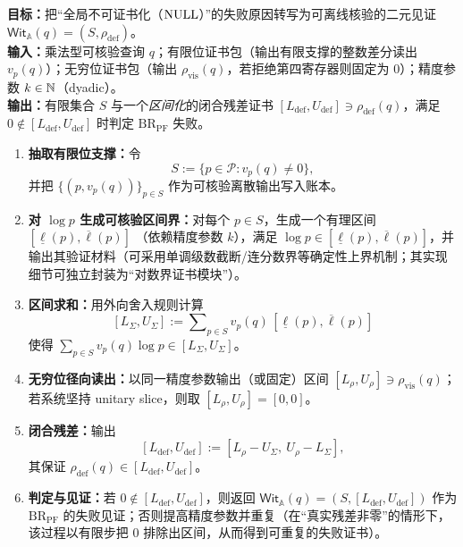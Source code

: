 \begin{algorithm}\label{alg:future-adelic-witness}
\textbf{目标：}把“全局不可证书化（$\mathrm{NULL}$）”的失败原因转写为可离线核验的二元见证 $\mathsf{Wit}_{\mathbb{A}}(q)=(S,\rho_{\mathrm{def}})$。\\
\textbf{输入：}乘法型可核验查询 $q$；有限位证书包（输出有限支撑的整数差分读出 $v_p(q)$）；无穷位证书包（输出 $\rho_{\mathrm{vis}}(q)$，若拒绝第四寄存器则固定为 $0$）；精度参数 $k\in\mathbb{N}$（dyadic）。\\
\textbf{输出：}有限集合 $S$ 与一个\emph{区间化}的闭合残差证书 $[L_{\mathrm{def}},U_{\mathrm{def}}]\ni\rho_{\mathrm{def}}(q)$，满足 $0\notin[L_{\mathrm{def}},U_{\mathrm{def}}]$ 时判定 $\mathrm{BR}_{\mathrm{PF}}$ 失败。\\
\begin{enumerate}
  \item \textbf{抽取有限位支撑：}令
  $$
  S:=\{p\in\mathcal{P}:v_p(q)\neq 0\},
  $$
  并把 $\{(p,v_p(q))\}_{p\in S}$ 作为可核验离散输出写入账本。
  \item \textbf{对 $\log p$ 生成可核验区间界：}对每个 $p\in S$，生成一个有理区间
  $
  [\underline{\ell}(p),\overline{\ell}(p)]
  $
  （依赖精度参数 $k$），满足 $\log p\in[\underline{\ell}(p),\overline{\ell}(p)]$，并输出其验证材料（可采用单调级数截断/连分数界等确定性上界机制；其实现细节可独立封装为“对数界证书模块”）。
  \item \textbf{区间求和：}用外向舍入规则计算
  $$
  [L_\Sigma,U_\Sigma]
  :=\sum\nolimits_{p\in S} v_p(q)\,[\underline{\ell}(p),\overline{\ell}(p)]
  $$
  使得 $\sum_{p\in S}v_p(q)\log p\in[L_\Sigma,U_\Sigma]$。
  \item \textbf{无穷位径向读出：}以同一精度参数输出（或固定）区间 $[L_\rho,U_\rho]\ni\rho_{\mathrm{vis}}(q)$；若系统坚持 unitary slice，则取 $[L_\rho,U_\rho]=[0,0]$。
  \item \textbf{闭合残差：}输出
  $$
  [L_{\mathrm{def}},U_{\mathrm{def}}]
  :=[L_\rho-U_\Sigma,\ U_\rho-L_\Sigma],
  $$
  其保证 $\rho_{\mathrm{def}}(q)\in[L_{\mathrm{def}},U_{\mathrm{def}}]$。
  \item \textbf{判定与见证：}若 $0\notin[L_{\mathrm{def}},U_{\mathrm{def}}]$，则返回 $\mathsf{Wit}_{\mathbb{A}}(q)=(S,[L_{\mathrm{def}},U_{\mathrm{def}}])$ 作为 $\mathrm{BR}_{\mathrm{PF}}$ 的失败见证；否则提高精度参数并重复（在“真实残差非零”的情形下，该过程以有限步把 $0$ 排除出区间，从而得到可重复的失败证书）。
\end{enumerate}
\end{algorithm}

